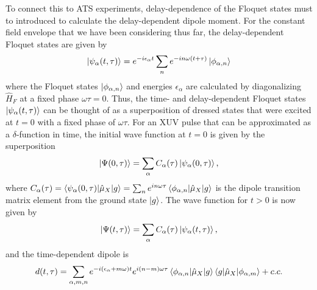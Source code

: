 To connect this to ATS experiments, delay-dependence  of the Floquet states must to introduced to calculate the delay-dependent dipole moment.  For the constant field envelope that we have been considering thus far, the delay-dependent Floquet states are given by
\begin{equation}
	\ket{\psi_\alpha(t,\tau)}=e^{-i\epsilon_\alpha t}\sum_{n}e^{-i n\omega(t+\tau)}\ket{\phi_{\alpha,n}}
\end{equation}
where the Floquet states $\ket{\phi_{\alpha,n}}$ and energies $\epsilon_\alpha$ are calculated by diagonalizing $\hat{H}_F$ at a fixed phase $\omega\tau=0$.  Thus, the time- and delay-dependent Floquet states $\ket{\psi_\alpha(t,\tau)}$ can be thought of as a superposition of dressed states that were excited at $t=0$ with a fixed phase of $\omega\tau$.  For an XUV pulse that can be approximated as a $\delta$-function in time, the initial wave function at $t=0$ is given by the superposition
\begin{equation}
	\ket{\Psi(0,\tau)}=\sum_{\alpha}C_{\alpha}(\tau)\ket{\psi_{\alpha}(0,\tau)},
\end{equation}
where $C_\alpha(\tau)=\braket{\psi_\alpha(0,\tau)|\hat{\mu}_X|g} = \sum_n e^{in\omega\tau}\braket{\phi_{\alpha,n}|\hat{\mu}_X|g}$ is the dipole transition matrix element from the ground state $\ket{g}$.  The wave function for $t>0$ is now given by
\begin{equation}
	\ket{\Psi(t,\tau)}=\sum_\alpha C_{\alpha}(\tau)\ket{\psi_{\alpha}(t,\tau)},
\end{equation}
and the time-dependent dipole is
\begin{equation}
\label{eqn:Floquet_dipole}
	d(t,\tau) =\sum_{\alpha,m,n}e^{-i(\epsilon_\alpha+m\omega)t}e^{i(n-m)\omega\tau} \braket{\phi_{\alpha,n}|\hat{\mu}_X|g} \braket{g|\hat{\mu}_X|\phi_{\alpha,m}} + c.c.
\end{equation}
